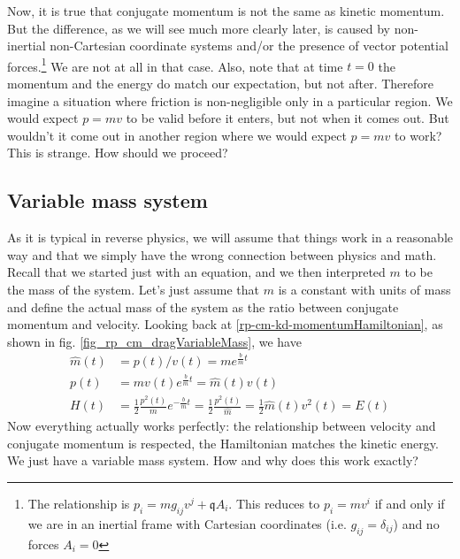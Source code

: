 Now, it is true that conjugate momentum is not the same as kinetic momentum. But the difference, as we will see much more clearly later, is caused by non-inertial non-Cartesian coordinate systems and/or the presence of vector potential forces.\footnote{The relationship is $p_i = m g_{ij} v^j + \mathfrak{q} A_i$. This reduces to $p_i = m v^i$ if and only if we are in an inertial frame with Cartesian coordinates (i.e. $g_{ij}=\delta_{ij}$) and no forces $A_i = 0$} We are not at all in that case. Also, note that at time $t=0$ the momentum and the energy do match our expectation, but not after. Therefore imagine a situation where friction is non-negligible only in a particular region. We would expect $p=mv$ to be valid before it enters, but not when it comes out. But wouldn't it come out in another region where we would expect $p=mv$ to work? This is strange. How should we proceed?

\subsection{Variable mass system}

As it is typical in reverse physics, we will assume that things work in a reasonable way and that we simply have the wrong connection between physics and math. Recall that we started just with an equation, and we then interpreted $m$ to be the mass of the system. Let's just assume that $m$ is a constant with units of mass and define the actual mass of the system as the ratio between conjugate momentum and velocity. Looking back at \ref{rp-cm-kd-momentumHamiltonian}, as shown in fig. \ref{fig_rp_cm_dragVariableMass}, we have 
\begin{equation}
	\begin{aligned}
	\hat{m}(t) &= p(t) / v(t) = m e^{\frac{b}{m}t} \\
	p(t) &= mv(t)e^{\frac{b}{m}t} = \hat{m}(t) v(t) \\
	H(t) &= \frac{1}{2} \frac{p^2(t)}{m}  e^{-\frac{b}{m}t} = \frac{1}{2} \frac{p^2(t)}{\hat{m}} = \frac{1}{2} \hat{m}(t) v^2(t) = E(t)
	\end{aligned}
\end{equation}
Now everything actually works perfectly: the relationship between velocity and conjugate momentum is respected, the Hamiltonian matches the kinetic energy. We just have a variable mass system. How and why does this work exactly?

